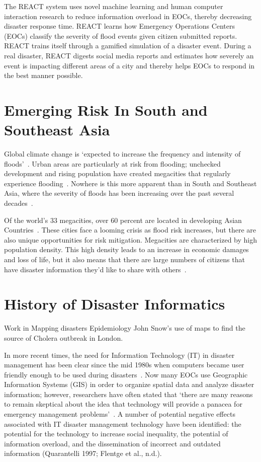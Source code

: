 The REACT system uses novel machine learning and human computer interaction
research to reduce information overload in EOCs, thereby decreasing disaster
response time. REACT learns how Emergency Operations Centers (EOCs) classify the
severity of flood events given citizen submitted reports. REACT trains itself
through a gamified simulation of a disaster event. During a real disaster, REACT
digests social media reports and estimates how severely an event is impacting
different areas of a city and thereby helps EOCs to respond in the best manner
possible.

\section{Emerging Risk In South and Southeast Asia}
Global climate change is `expected to increase the frequency and intensity of
floods'~\cite{ahernGlobalHealthImpacts2005}.  Urban areas are particularly at
risk from flooding; unchecked development and rising population have created
megacities that regularly experience flooding~\cite{chanFloodRiskAsia2012}. Nowhere is
this more apparent than in South and Southeast Asia, where the severity of
floods has been increasing over the past several
decades~\cite{tortiFloodsSoutheastAsia2012}.

Of the world's 33 megacities, over 60 percent are located in developing Asian
Countries~\cite{unitednationsdepartmentofeconomicandsocialaffairsWorldCities20162016}.
These cities face a looming crisis as flood risk increases, but there are also
unique opportunities for risk mitigation. Megacities are characterized by high
population density. This high density leads to an increase in economic damages
and loss of life, but it also means that there are large numbers of citizens
that have disaster information they'd like to share with
others~\cite{chanFloodRiskAsia2012}.

\section{History of Disaster Informatics}

Work in Mapping disasters Epidemiology
John Snow's use of maps to find the source of Cholera outbreak in
London\cite{rogersJohnSnowData2013}.


In more recent times, the need for Information Technology (IT) in disaster
management has been clear since the mid 1980s when computers became user
friendly enough to be used during
disasters~\cite{universityTerminalDisastersComputer1986}. Now many EOCs use
Geographic Information Systems (GIS) in order to organize spatial data and
analyze disaster information; however, researchers have often stated that `there
are many reasons to remain skeptical about the idea that technology will provide
a panacea for emergency management problems'~\cite{tzemosUseGISFederal1995,
tierneyFacingUnexpectedDisaster2001, perryNaturalDisasterManagement2007}.
A number of potential negative effects associated with
IT disaster management technology have been identified: the potential for the
technology to increase social inequality, the potential of information overload,
and the dissemination of incorrect and outdated information (Quarantelli 1997;
Flentge et al., n.d.).


